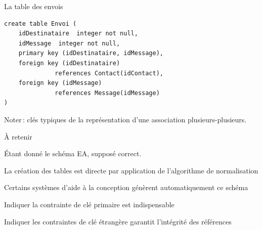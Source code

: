 \begin{frame}[fragile]{La table des envois}

\vfill

\begin{verbatim}
create table Envoi ( 
    idDestinataire  integer not null,
    idMessage  integer not null,
    primary key (idDestinataire, idMessage),
    foreign key (idDestinataire) 
              references Contact(idContact),
    foreign key (idMessage) 
              references Message(idMessage)
)
\end{verbatim}

\vfill


\alert{Noter}\,: clés typiques de la
représentation d'une association plusieurs-plusieurs.



\end{frame}
\begin{frame}{À retenir}

\'Etant donné le schéma EA, supposé correct.

\vfill

\begin{redbullet}
  \item La création des tables est \alert{directe} par application
       de l'algorithme de normalisation
   \item Certains systèmes d'aide à la  conception génèrent automatiquement ce schéma
   \item Indiquer la contrainte de clé primaire est indispensable
   \item Indiquer les contraintes de clé étrangère garantit
            l'intégrité des références
\end{redbullet}

\vfill

\end{frame}

